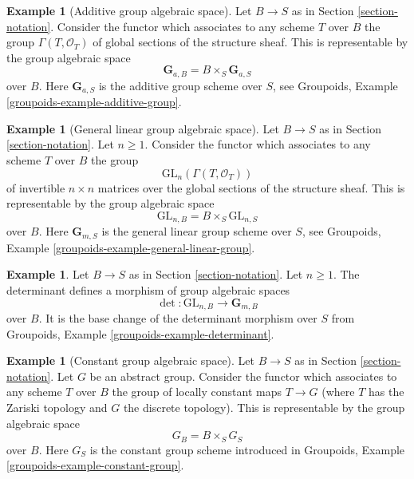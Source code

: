 \documentclass{stacks-project}
\theoremstyle{plain}
\theoremstyle{definition}
\newtheorem{example}[subsection]{Example}
\theoremstyle{remark}
\numberwithin{equation}{subsection}
\begin{document}
\begin{example}[Additive group algebraic space]
\label{example-additive-group}
Let $B \to S$ as in Section \ref{section-notation}.
Consider the functor which associates
to any scheme $T$ over $B$ the group $\Gamma(T, \mathcal{O}_T)$
of global sections of the structure sheaf.
This is representable by the group algebraic space
$$
\mathbf{G}_{a, B} = B \times_S \mathbf{G}_{a, S}
$$
over $B$. Here $\mathbf{G}_{a, S}$ is the additive group scheme
over $S$, see
Groupoids, Example \ref{groupoids-example-additive-group}.
\end{example}

\begin{example}[General linear group algebraic space]
\label{example-general-linear-group}
Let $B \to S$ as in Section \ref{section-notation}.
Let $n \geq 1$.
Consider the functor which associates
to any scheme $T$ over $B$ the group
$$
\text{GL}_n(\Gamma(T, \mathcal{O}_T))
$$
of invertible $n \times n$ matrices over
the global sections of the structure sheaf.
This is representable by the group algebraic space
$$
\text{GL}_{n, B} = B \times_S \text{GL}_{n, S}
$$
over $B$. Here $\mathbf{G}_{m, S}$ is the general linear group scheme
over $S$, see
Groupoids, Example \ref{groupoids-example-general-linear-group}.
\end{example}

\begin{example}
\label{example-determinant}
Let $B \to S$ as in Section \ref{section-notation}.
Let $n \geq 1$.
The determinant defines a morphism of group algebraic spaces
$$
\det : \text{GL}_{n, B} \longrightarrow \mathbf{G}_{m, B}
$$
over $B$. It is the base change of the determinant morphism
over $S$ from
Groupoids, Example \ref{groupoids-example-determinant}.
\end{example}

\begin{example}[Constant group algebraic space]
\label{example-constant-group}
Let $B \to S$ as in Section \ref{section-notation}.
Let $G$ be an abstract group. Consider the functor
which associates to any scheme $T$ over $B$ the group
of locally constant maps $T \to G$ (where $T$ has the Zariski topology
and $G$ the discrete topology). This is representable by the
group algebraic space
$$
G_B = B \times_S G_S
$$
over $B$. Here $G_S$ is the constant group scheme introduced in
Groupoids, Example \ref{groupoids-example-constant-group}.
\end{example}
\end{document}
